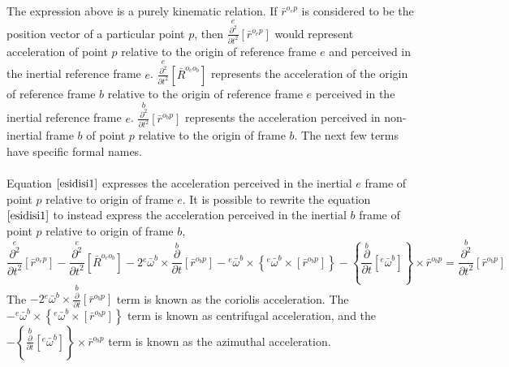 \documentclass[class=report, 12pt, crop=false]{standalone}
\begin{document}
\begin{center}
The expression above is a purely kinematic relation. If $\displaystyle \bar{r}^{o_{e}p}$ is considered to be the position vector of a particular point $p$, then $\displaystyle \overset{e}{\frac{\partial^{2}}{\partial t^{2}}}[\bar{r}^{o_{e}p}]$ would represent acceleration of point $p$ relative to the origin of reference frame $e$ and perceived in the inertial reference frame $e$. $\displaystyle \overset{e}{\frac{\partial^{2}}{\partial t^{2}}}[\bar{R}^{o_{e}o_{b}}]$ represents the acceleration of the origin of reference frame $b$ relative to the origin of reference frame $e$ perceived in the inertial reference frame $e$. $\displaystyle \overset{b}{\frac{\partial^{2}}{\partial t^{2}}}[\bar{r}^{o_{b}p}]$ represents the acceleration perceived in non-inertial frame $b$ of point $p$ relative to the origin of frame $b$. The next few terms have specific formal names.
\\~\\Equation $\ref{esidisi1}$ expresses the acceleration perceived in the inertial $e$ frame of point $p$ relative to origin of frame $e$. It is possible to rewrite the equation $\ref{esidisi1}$ to instead express the acceleration perceived in the inertial $b$ frame of point $p$ relative to origin of frame $b$,
\begin{equation}\overset{e}{\frac{\partial^{2}}{\partial t^{2}}}[\bar{r}^{o_{e}p}]  -  \overset{e}{\frac{\partial^{2}}{\partial t^{2}}}[\bar{R}^{o_{e}o_{b}}]  -  2{}^{e}\bar{\omega}^{b}\times\overset{b}{\frac{\partial}{\partial t}}[\bar{r}^{o_{b}p}]    -   {}^{e}\bar{\omega}^{b}\times\left\{{}^{e}\bar{\omega}^{b}\times\left[\bar{r}^{o_{b}p}\right]\right\}  -    \left\{\overset{b}{\frac{\partial}{\partial t}}[{}^{e}\bar{\omega}^{b}]\right\}\times\bar{r}^{o_{b}p} =  \overset{b}{\frac{\partial^{2}}{\partial t^{2}}}[\bar{r}^{o_{b}p}]    \label{esidisi2}\end{equation}
The $\displaystyle   -  2{}^{e}\bar{\omega}^{b}\times\overset{b}{\frac{\partial}{\partial t}}[\bar{r}^{o_{b}p}]$ term is known as the coriolis acceleration. The $\displaystyle     -   {}^{e}\bar{\omega}^{b}\times\left\{{}^{e}\bar{\omega}^{b}\times\left[\bar{r}^{o_{b}p}\right]\right\}$ term is known as centrifugal acceleration, and the $\displaystyle   -    \left\{\overset{b}{\frac{\partial}{\partial t}}[{}^{e}\bar{\omega}^{b}]\right\}\times\bar{r}^{o_{b}p}$ term is known as the azimuthal acceleration. 

\end{center}
\end{document}
